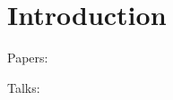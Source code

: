 \chapter{Introduction}

Papers:
\cite{%
  cattaneo2024uniform,%
  cattaneo2022yurinskii,%
  cattaneo2023inference%
}

Talks:
\cite{%
  cattaneo2022talkgeorgia,%
  cattaneo2022talkcolumbia,%
  feng2022talkrenmin,%
  feng2022talkxiamen,%
  feng2023talkpeking,%
  feng2023talksingapore,%
  underwood2024talkmichigan,%
  underwood2024talkillinois,%
  underwood2024talkpitt%
}
